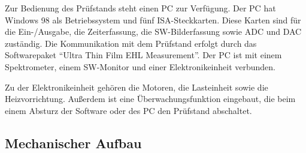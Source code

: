 Zur Bedienung des Prüfstands steht einen PC zur Verfügung.
Der PC hat Windows 98 als Betriebssystem und fünf ISA-Steckkarten.
Diese Karten sind für die Ein-/Ausgabe, die Zeiterfassung, die SW-Bilderfassung sowie ADC und DAC zuständig.
Die Kommunikation mit dem Prüfstand erfolgt durch das Softwarepaket ``Ultra Thin Film EHL Measurement''.
Der PC ist mit einem Spektrometer, einem SW-Monitor und einer Elektronikeinheit verbunden.

Zu der Elektronikeinheit gehören die Motoren, die Lasteinheit sowie die Heizvorrichtung.
Außerdem ist eine Überwachungsfunktion eingebaut, die beim einem Absturz der Software oder des PC den Prüfstand abschaltet.

\subsection{Mechanischer Aufbau}
\label{sub:mechanischer_aufbau}

